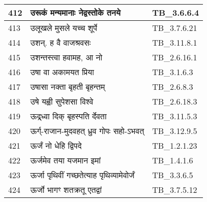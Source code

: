 \documentclass[17pt]{extarticle}
\begin{document}
\begin{longtable}{||p{0.4in}||p{4.9in}||p{0.9in}||}
    \hline
        
    412 & उरूकं मन्यमानाः नेद्वस्तोके तनये & TB\_3.6.6.4       \\
    
    \hline
        
    413 & उलूखले मुसले यच्च शूर्पे & TB\_3.7.6.21       \\
    
    \hline
        
    414 & उशन्. ह वै वाजश्रवसः & TB\_3.11.8.1       \\
    
    \hline
        
    415 & उशन्तस्त्वा हवामह, आ नो & TB\_2.6.16.1       \\
    
    \hline
        
    416 & उषा वा अकामयत प्रिया & TB\_3.1.6.3       \\
    
    \hline
        
    417 & उषासा नक्ता बृहती बृहन्तम् & TB\_2.6.8.3       \\
    
    \hline
        
    418 & उषे यह्वी सुपेशसा विश्वे & TB\_2.6.18.3       \\
    
    \hline
        
    419 & ऊद्र्ध्वा दिक् बृहस्पति र्देवता & TB\_3.11.5.3       \\
    
    \hline
        
    420 & ऊर्ग्{-}राजान{-}मुदवहत् ध्रुव गोपः सहो{-}ऽभवत् & TB\_3.12.9.5       \\
    
    \hline
        
    421 & ऊर्जं नो धेहि द्विपदे & TB\_1.2.1.23       \\
    
    \hline
        
    422 & ऊर्जमेव तया यजमान इमां & TB\_1.4.1.6       \\
    
    \hline
        
    423 & ऊर्जा पृथिवीं गच्छतेत्याह पृथिव्यामेवोर्जं & TB\_3.3.6.5       \\
    
    \hline
        
    424 & ऊर्जो भागꣳ शतक्रतू एतद्वां & TB\_3.7.5.12       \\
    

\end{longtable}
\end{document}
